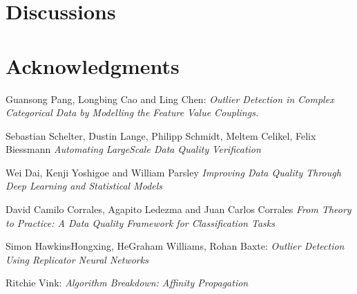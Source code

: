 \documentclass{article}
\begin{document}

\section{Discussions} %
\label{sec:Discussions}




\section*{Acknowledgments} %
\label{sec:Acknowledgments}




\begin{thebibliography}{999}

    Guansong Pang, Longbing Cao and Ling Chen:
    \emph{Outlier Detection in Complex Categorical Data
        by Modelling the Feature Value Couplings.}

    Sebastian Schelter, Dustin Lange, Philipp Schmidt, Meltem Celikel, Felix Biessmann
    \emph{Automating LargeScale Data Quality Verification}

    Wei Dai, Kenji Yoshigoe and William Parsley
    \emph{Improving Data Quality Through Deep Learning and Statistical Models}

    David Camilo Corrales, Agapito Ledezma and Juan Carlos Corrales
    \emph{From Theory to Practice: A Data Quality Framework
        for Classification Tasks}

    Simon HawkinsHongxing, HeGraham Williams, Rohan Baxte:
    \emph{Outlier Detection Using Replicator Neural Networks}

    Ritchie Vink:
    \emph{Algorithm Breakdown: Affinity Propagation}


\end{thebibliography}
\end{document}
